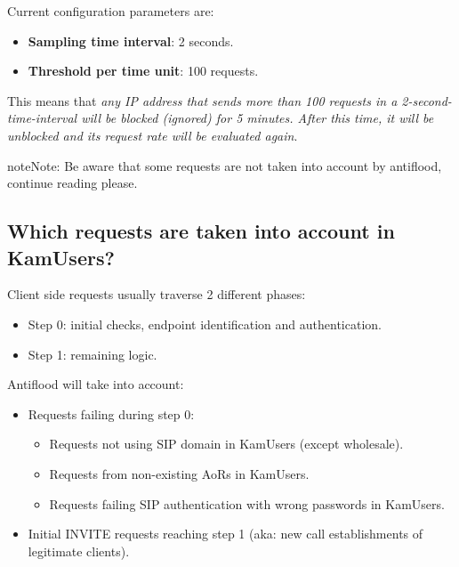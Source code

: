 \documentclass[letterpaper,10pt,english]{sphinxmanual}
\begin{document}
Current configuration parameters are:
\begin{itemize}
\item {} 
\textbf{Sampling time interval}: 2 seconds.

\item {} 
\textbf{Threshold per time unit}: 100 requests.

\end{itemize}

This means that \emph{any IP address that sends more than 100 requests in a 2-second-time-interval will be blocked (ignored)
for 5 minutes. After this time, it will be unblocked and its request rate will be evaluated again}.

\begin{notice}{note}{Note:}
Be aware that some requests are not taken into account by antiflood, continue reading please.
\end{notice}


\subsection{Which requests are taken into account in KamUsers?}
\label{security_and_maintenance/security/antiflooding:which-requests-are-taken-into-account-in-kamusers}
Client side requests usually traverse 2 different phases:
\begin{itemize}
\item {} 
Step 0: initial checks, endpoint identification and authentication.

\item {} 
Step 1: remaining logic.

\end{itemize}

Antiflood will take into account:
\begin{itemize}
\item {} 
Requests failing during step 0:
\begin{itemize}
\item {} 
Requests not using SIP domain in KamUsers (except wholesale).

\item {} 
Requests from non-existing AoRs in KamUsers.

\item {} 
Requests failing SIP authentication with wrong passwords in KamUsers.

\end{itemize}

\item {} 
Initial INVITE requests reaching step 1 (aka: new call establishments of legitimate clients).

\end{itemize}
\end{document}
